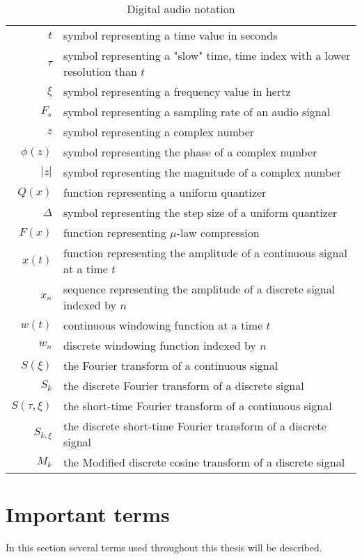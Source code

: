 \begin{table}[htbp]\caption{Digital audio notation}
\begin{tabular}{r l}
$t$ & symbol representing a time value in seconds \\
$\tau$ & symbol representing a "slow" time, time index with a lower resolution than $t$ \\
$\xi$ & symbol representing a frequency value in hertz \\
$F_s$ & symbol representing a sampling rate of an audio signal \\
$z$ & symbol representing a complex number \\
$\phi(z)$ & symbol representing the phase of a complex number \\
$|z|$ & symbol representing the magnitude of a complex number \\
$Q(x)$ & function representing a uniform quantizer \\
$\Delta$ & symbol representing the step size of a uniform quantizer \\
$F(x)$ & function representing $\mu$-law compression \\
$x(t)$ & function representing the amplitude of a continuous signal at a time $t$ \\
$x_n$ & sequence representing the amplitude of a discrete signal indexed by $n$ \\
$w(t)$ & continuous windowing function at a time $t$ \\
$w_n$ & discrete windowing function indexed by $n$ \\
$S(\xi)$ & the Fourier transform of a continuous signal \\
$S_k$ & the discrete Fourier transform of a discrete signal \\
$S(\tau, \xi)$ & the short-time Fourier transform of a continuous signal \\
$S_{k, \xi}$ & the discrete short-time Fourier transform of a discrete signal \\
$M_k$ & the Modified discrete cosine transform of a discrete signal
\end{tabular}
\end{table}

\section{Important terms}
In this section several terms used throughout this thesis will be described.

